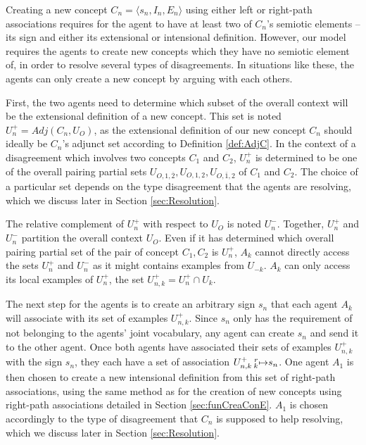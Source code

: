 Creating a new concept $C_{n} = \langle s_{n}, I_{n}, E_{n} \rangle$ using either left or right-path associations requires for the agent to have at least two of $C_{n}$'s semiotic elements -- its sign and either its extensional or intensional definition. However, our model requires the agents to create new concepts which they have no semiotic element of, in order to resolve several types of disagreements. In situations like these, the agents can only create a new concept by arguing with each others.

First, the two agents need to determine which subset of the overall context will be the extensional definition of a new concept. This set is noted $U_{n}^{+} = Adj(C_{n},U_{O})$, as the extensional definition of our new concept $C_{n}$ should ideally be $C_{n}$'s adjunct set according to Definition \ref{def:AdjC}.
In the context of a disagreement which involves two concepts $C_{1}$ and $C_{2}$, $U^{+}_{n}$ is determined to be one of the overall pairing partial sets $U_{O,1,\overbar{2}}, U_{O,1,2}, U_{O,\overbar{1},2}$ of $C_{1}$ and $C_{2}$. The choice of a particular set depends on the type disagreement that the agents are resolving, which we discuss later in Section \ref{sec:Resolution}.

The relative complement of $U^{+}_{n}$ with respect to $U_{O}$ is noted $U^{-}_{n}$. Together, $U^{+}_{n}$ and $U^{-}_{n}$ partition the overall context $U_{O}$. Even if it has determined which overall pairing partial set of the pair of concept $C_{1},C_{2}$ is $U^{+}_{n}$, $A_{k}$ cannot directly access the sets $U^{+}_{n}$ and $U^{-}_{n}$ as it might contains examples from $U_{-k}$. $A_{k}$ can only access its local examples of $U^{+}_{n}$, the set $U^{+}_{n,k} = U^{+}_{n} \cap U_{k}$.

The next step for the agents is to create an arbitrary sign $s_{n}$ that each agent $A_{k}$ will associate with its set of examples $U^{+}_{n,k}$. Since $s_{n}$ only has the requirement of not belonging to the agents' joint vocabulary, any agent can create $s_{n}$ and send it to the other agent. Once both agents have associated their sets of examples $U^{+}_{n,k}$ with the sign $s_{n}$, they each have a set of association $U^{+}_{n,k} \prescript{r}{k}{\mapsto} s_{n}$. One agent $A_{1}$ is then chosen to create a new intensional definition from this set of right-path associations, using the same method as for the creation of new concepts using right-path associations detailed in Section \ref{sec:funCreaConE}. $A_{1}$ is chosen accordingly to the type of disagreement that $C_{n}$ is supposed to help resolving, which we discuss later in Section \ref{sec:Resolution}.

